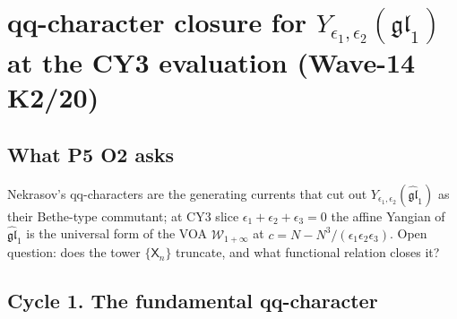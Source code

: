 
\providecommand{\ClaimStatusTheorem}{\textsc{[theorem]}}
\providecommand{\ClaimStatusConjectured}{\textsc{[conjectural]}}
\providecommand{\ClaimStatusHeuristic}{\textsc{[heuristic]}}
\providecommand{\ClaimStatusDefinition}{\textsc{[definition]}}
\providecommand{\kch}{\kappa_{\mathrm{ch}}}
\providecommand{\kcat}{\kappa_{\mathrm{cat}}}
\providecommand{\kBKM}{\kappa_{\mathrm{BKM}}}
\providecommand{\kfib}{\kappa_{\mathrm{fiber}}}
\providecommand{\CC}{\mathbb{C}}
\providecommand{\ZZ}{\mathbb{Z}}
\providecommand{\Yeps}{Y_{\epsilon_1,\epsilon_2}(\widehat{\mathfrak{gl}}_1)}
\providecommand{\YLMN}{Y_{L,M,N}}
\providecommand{\Winf}{\mathcal{W}_{1+\infty}}
\providecommand{\Xqq}{\mathsf{X}}
\providecommand{\Yqq}{\mathsf{Y}}
\providecommand{\qexp}[1]{q^{#1}}
\providecommand{\gldual}{\widehat{\mathfrak{gl}}_1}
\providecommand{\qchoose}[2]{\genfrac{[}{]}{0pt}{}{#1}{#2}}

\section{qq-character closure for $\Yeps$ at the CY3 evaluation (Wave-14 K2/20)}
\label{wn:sec:wave14-k2-qq-character-closure}

\subsection{What P5 O2 asks}

Nekrasov's qq-characters \cite{Nekrasov1512.05388} are the generating
currents that cut out $\Yeps$ as their Bethe-type commutant; at CY3
slice $\epsilon_1+\epsilon_2+\epsilon_3=0$ the affine Yangian of
$\gldual$ is the universal form of the VOA $\Winf$ at $c=N-N^3/(\epsilon_1
\epsilon_2\epsilon_3)$. Open question: does the tower $\{\Xqq_n\}$ truncate,
and what functional relation closes it?

\subsection{Cycle 1. The fundamental qq-character}

